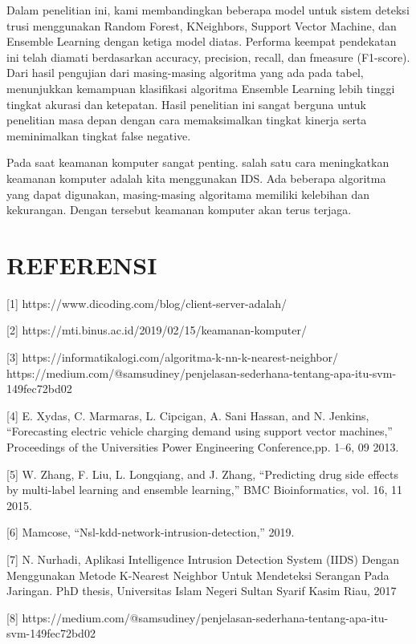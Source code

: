 \documentclass[conference]{IEEEtran}
\begin{document}
Dalam penelitian ini, kami membandingkan beberapa model
untuk sistem deteksi trusi menggunakan Random Forest, KNeighbors, Support Vector Machine, dan Ensemble Learning
dengan ketiga model diatas. Performa keempat pendekatan ini
telah diamati berdasarkan accuracy, precision, recall, dan fmeasure (F1-score).
Dari hasil pengujian dari masing-masing algoritma yang
ada pada tabel, menunjukkan kemampuan klasifikasi algoritma
Ensemble Learning lebih tinggi tingkat akurasi dan ketepatan.
Hasil penelitian ini sangat berguna untuk penelitian masa
depan dengan cara memaksimalkan tingkat kinerja serta meminimalkan tingkat false negative.

Pada saat keamanan komputer sangat penting. salah satu
cara meningkatkan keamanan komputer adalah kita menggunakan IDS. Ada beberapa algoritma yang dapat digunakan,
masing-masing algoritama memiliki kelebihan dan kekurangan. Dengan tersebut keamanan komputer akan terus terjaga.


\section*{REFERENSI}

[1] https://www.dicoding.com/blog/client-server-adalah/

[2] https://mti.binus.ac.id/2019/02/15/keamanan-komputer/

[3] https://informatikalogi.com/algoritma-k-nn-k-nearest-neighbor/
https://medium.com/@samsudiney/penjelasan-sederhana-tentang-apa-itu-svm-149fec72bd02

[4] E. Xydas, C. Marmaras, L. Cipcigan, A. Sani Hassan, and N. Jenkins,
“Forecasting electric vehicle charging demand using support vector machines,” Proceedings of the Universities Power Engineering Conference,pp. 1–6, 09 2013.

[5] W. Zhang, F. Liu, L. Longqiang, and J. Zhang, “Predicting drug side
effects by multi-label learning and ensemble learning,” BMC Bioinformatics, vol. 16, 11 2015.

[6] Mamcose, “Nsl-kdd-network-intrusion-detection,” 2019.

[7] N. Nurhadi, Aplikasi Intelligence Intrusion Detection System (IIDS)
Dengan Menggunakan Metode K-Nearest Neighbor Untuk Mendeteksi
Serangan Pada Jaringan. PhD thesis, Universitas Islam Negeri Sultan
Syarif Kasim Riau, 2017

[8] https://medium.com/@samsudiney/penjelasan-sederhana-tentang-apa-itu-svm-149fec72bd02
\end{document}
